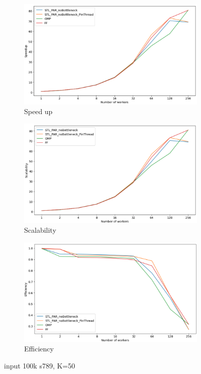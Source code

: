 \documentclass[12pt,a4paper]{report}
\begin{document}
\begin{figure}
     \centering
     \begin{subfigure}[b]{0.45\textwidth}
         \centering
         \includegraphics[width=\textwidth]{images/optimized-speedup.png}
         \caption{Speed up}
         \label{fig:y equals x}
     \end{subfigure}
     \hfill
     \begin{subfigure}[b]{0.45\textwidth}
         \centering
         \includegraphics[width=\textwidth]{images/optimized-scalability.png}
         \caption{Scalability}
         \label{fig:three sin x}
     \end{subfigure}
     \hfill
     \begin{subfigure}[b]{0.45\textwidth}
         \centering
         \includegraphics[width=\textwidth]{images/optimized-efficiency.png}
         \caption{Efficiency}
         \label{fig:improved performance}
     \end{subfigure}
        \caption{input 100k s789, K=50}
        \label{fig:three graphs}
\end{figure}
\end{document}
